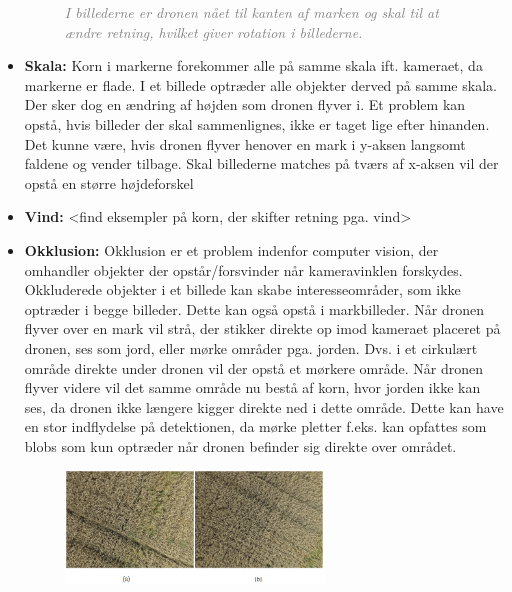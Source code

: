 \begin{itemize}
{\begin{figure}[H]
     \vspace{-1em}
    \begin{center}    
       \caption{\textcolor{gray}{\footnotesize \textit{ I billederne er dronen nået til kanten af marken og skal til at ændre retning, hvilket giver rotation i billederne.}}}
    \label{fig:rotation}
     \end{center}
     \vspace{-2.5em}
  \end{figure} \noindent
}
\item{\textbf{Skala:} Korn i markerne forekommer alle på samme skala ift. kameraet, da markerne er flade. I et billede optræder alle objekter derved på samme skala. Der sker dog en ændring af højden som dronen flyver i. Et problem kan opstå, hvis billeder der skal sammenlignes, ikke er taget lige efter hinanden. Det kunne være, hvis dronen flyver henover en mark i y-aksen langsomt faldene og vender tilbage. Skal billederne matches på tværs af x-aksen vil der opstå en større højdeforskel}
\item{\textbf{Vind:} <find eksempler på korn, der skifter retning pga. vind> }
\item{\textbf{Okklusion:}
Okklusion er et problem indenfor computer vision, der omhandler objekter der opstår/forsvinder når kameravinklen forskydes. Okkluderede objekter i et billede kan skabe interesseområder, som ikke optræder i begge billeder. Dette kan også opstå i markbilleder. Når dronen flyver over en mark vil strå, der stikker direkte op imod kameraet placeret på dronen, ses som jord, eller mørke områder pga. jorden. Dvs. i et cirkulært område direkte under dronen vil der opstå et mørkere område. Når dronen flyver videre vil det samme område nu bestå af korn, hvor jorden ikke kan ses, da dronen ikke længere kigger direkte ned i dette område. Dette kan have en stor indflydelse på detektionen, da mørke pletter f.eks. kan opfattes som blobs som kun optræder når dronen befinder sig direkte over området. 
\begin{figure}[H]
    \centering
    \includegraphics[width=0.65\textwidth]{fig/18.png}
     \vspace{-1em}

\end{figure}}
\end{itemize}
